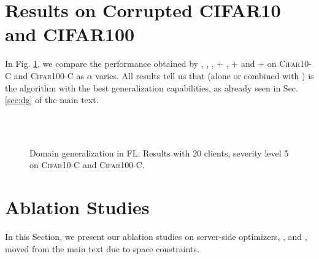 \section{Results on Corrupted CIFAR10 and CIFAR100}
\label{app:corr}
In Fig. \ref{fig:cifar-c-supp}, we compare the performance obtained by \fedavg, \fedsam, \fedasam, \fedavg+ \swa, \fedsam+ \swa and \fedasam+ \swa on \textsc{Cifar10-C} and \textsc{Cifar100-C} as $\alpha$ varies. All results tell us that \asam (alone or combined with \swa) is the algorithm with the best generalization capabilities, as already seen in Sec. \ref{sec:dg} of the main text. 
\captionsetup[subfloat]{font=scriptsize,labelformat=empty}
\begin{figure}[!t]
    \centering
    \\
    \\
    \caption{\footnotesize{Domain generalization in FL. Results with 20 clients, severity level 5 on \textsc{Cifar10-C} and \textsc{Cifar100-C}.}}
    \label{fig:cifar-c-supp}
    \vspace{-0.5cm}
\end{figure}

\section{Ablation Studies}
\label{app:abl}
In this Section, we present our ablation studies on server-side optimizers, \sam, \asam and \swa, moved from the main text due to space constraints.

